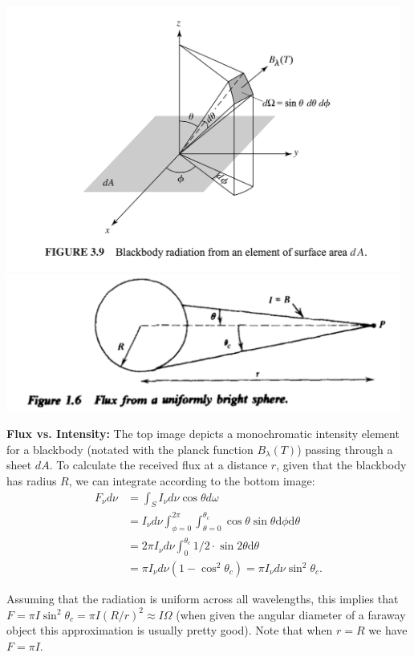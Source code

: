 \documentclass[12pt]{article}
\newcommand{\V}{

\vspace{\baselineskip}

}
\begin{document}
\begin{center}
    \includegraphics[width=13cm]{images/intensity.png}
    \includegraphics[width=13cm]{images/fluxdistance.png}
\end{center}

\textbf{Flux vs. Intensity:}\newline
The top image depicts a monochromatic intensity element for a blackbody (notated with the planck function $B_{\lambda}(T)$) passing through a sheet $dA$. To calculate the received flux at a distance $r$, given that the blackbody has radius $R$, we can integrate according to the bottom image:
\begin{align*}
F_{\nu}d\nu &= \int_S I_{\nu}d\nu\cos{\theta}d\omega \\
&= I_{\nu}d\nu \int_{\phi = 0}^{2\pi}\int_{\theta = 0}^{\theta_c}\cos{\theta}\sin{\theta}\mathrm{d}\phi \mathrm{d}\theta \\
&= 2\pi I_{\nu}d\nu\int_{0}^{\theta_c}1/2\cdot \sin{2\theta}\mathrm{d}\theta \\
&= \pi I_{\nu}d\nu (1-\cos^2{\theta_c}) = \pi I_{\nu}d\nu \sin^2{\theta_c}.
\end{align*}

Assuming that the radiation is uniform across all wavelengths, this implies that $F = \pi I \sin^2\theta_c = \pi I (R/r)^2 \approx I\Omega$ (when given the angular diameter of a faraway object this approximation is usually pretty good). Note that when $r=R$ we have $F = \pi I$.\V
\end{document}
